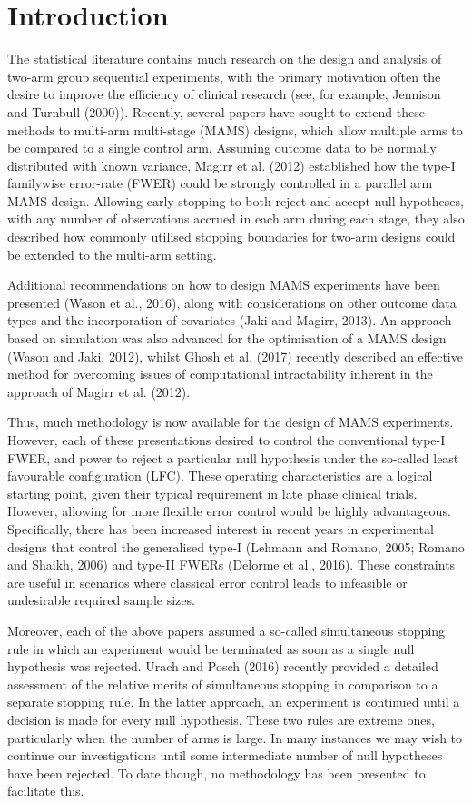 \documentclass{article}
\numberwithin{equation}{section}
\theoremstyle{plain}
\begin{document}
\section{Introduction}
\label{s:intro}

The statistical literature contains much research on the design and analysis of two-arm group sequential experiments, with the primary motivation often the desire to improve the efficiency of clinical research (see, for example, Jennison and Turnbull (2000)). Recently, several papers have sought to extend these methods to multi-arm multi-stage (MAMS) designs, which allow multiple arms to be compared to a single control arm. Assuming outcome data to be normally distributed with known variance, Magirr et al. (2012) established how the type-I familywise error-rate (FWER) could be strongly controlled in a parallel arm MAMS design. Allowing early stopping to both reject and accept null hypotheses, with any number of observations accrued in each arm during each stage, they also described how commonly utilised stopping boundaries for two-arm designs could be extended to the multi-arm setting.

Additional recommendations on how to design MAMS experiments have been presented (Wason et al., 2016), along with considerations on other outcome data types and the incorporation of covariates (Jaki and Magirr, 2013). An approach based on simulation was also advanced for the optimisation of a MAMS design (Wason and Jaki, 2012), whilst Ghosh et al. (2017) recently described an effective method for overcoming issues of computational intractability inherent in the approach of Magirr et al. (2012).

Thus, much methodology is now available for the design of MAMS experiments. However, each of these presentations desired to control the conventional type-I FWER, and power to reject a particular null hypothesis under the so-called least favourable configuration (LFC). These operating characteristics are a logical starting point, given their typical requirement in late phase clinical trials. However, allowing for more flexible error control would be highly advantageous. Specifically, there has been increased interest in recent years in experimental designs that control the generalised type-I (Lehmann and Romano, 2005; Romano and Shaikh, 2006) and type-II FWERs (Delorme et al., 2016). These constraints are useful in scenarios where classical error control leads to infeasible or undesirable required sample sizes. 

Moreover, each of the above papers assumed a so-called simultaneous stopping rule in which an experiment would be terminated as soon as a single null hypothesis was rejected. Urach and Posch (2016) recently provided a detailed assessment of the relative merits of simultaneous stopping in comparison to a separate stopping rule. In the latter approach, an experiment is continued until a decision is made for every null hypothesis. These two rules are extreme ones, particularly when the number of arms is large. In many instances we may wish to continue our investigations until some intermediate number of null hypotheses have been rejected. To date though, no methodology has been presented to facilitate this.
\end{document}
